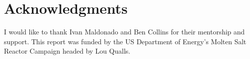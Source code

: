 \chapter*{Acknowledgments}
I would like to thank Ivan Maldonado and Ben Collins for their mentorship and support. This report was funded by the US Department of Energy's Molten Salt Reactor Campaign headed by Lou Qualls. 